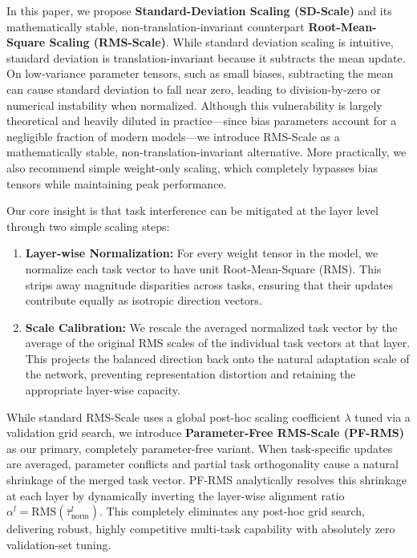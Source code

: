 In this paper, we propose \textbf{Standard-Deviation Scaling (SD-Scale)} and its mathematically stable, non-translation-invariant counterpart \textbf{Root-Mean-Square Scaling (RMS-Scale)}. While standard deviation scaling is intuitive, standard deviation is translation-invariant because it subtracts the mean update. On low-variance parameter tensors, such as small biases, subtracting the mean can cause standard deviation to fall near zero, leading to division-by-zero or numerical instability when normalized. Although this vulnerability is largely theoretical and heavily diluted in practice—since bias parameters account for a negligible fraction of modern models—we introduce RMS-Scale as a mathematically stable, non-translation-invariant alternative. More practically, we also recommend simple weight-only scaling, which completely bypasses bias tensors while maintaining peak performance.

Our core insight is that task interference can be mitigated at the layer level through two simple scaling steps:
\begin{enumerate}
    \item \textbf{Layer-wise Normalization:} For every weight tensor in the model, we normalize each task vector to have unit Root-Mean-Square (RMS). This strips away magnitude disparities across tasks, ensuring that their updates contribute equally as isotropic direction vectors.
    \item \textbf{Scale Calibration:} We rescale the averaged normalized task vector by the average of the original RMS scales of the individual task vectors at that layer. This projects the balanced direction back onto the natural adaptation scale of the network, preventing representation distortion and retaining the appropriate layer-wise capacity.
\end{enumerate}

While standard RMS-Scale uses a global post-hoc scaling coefficient $\lambda$ tuned via a validation grid search, we introduce \textbf{Parameter-Free RMS-Scale (PF-RMS)} as our primary, completely parameter-free variant. When task-specific updates are averaged, parameter conflicts and partial task orthogonality cause a natural shrinkage of the merged task vector. PF-RMS analytically resolves this shrinkage at each layer by dynamically inverting the layer-wise alignment ratio $\alpha^l = \text{RMS}(\bar{\tau}_{\text{norm}}^l)$. This completely eliminates any post-hoc grid search, delivering robust, highly competitive multi-task capability with absolutely zero validation-set tuning.

